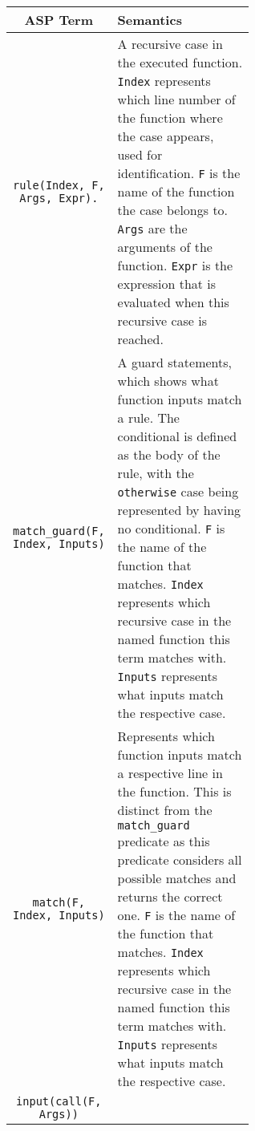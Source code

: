 \begin{center}
\begin{tabular}{| c | m{0.6\linewidth} |}
\hline
\textbf{ASP Term} & \textbf{Semantics} \\
\hline
\lstinline!rule(Index, F, Args, Expr).! 
&
\mbox{}\newline
A recursive case in the executed function. \newline
\lstinline!Index! represents which line number of the function where the case appears, used for identification.\newline
\lstinline!F! is the name of the function the case belongs to. \newline
\lstinline!Args! are the arguments of the function.\newline
\lstinline!Expr! is the expression that is evaluated when this recursive case is reached.\newline
\\
\hline
\lstinline!match_guard(F, Index, Inputs)! 
&
\mbox{}\newline
A guard statements, which shows what function inputs match a rule. The conditional is defined as the body of the rule, with the \lstinline!otherwise! case being represented by having no conditional. \newline
\lstinline!F! is the name of the function that matches. \newline
\lstinline!Index! represents which recursive case in the named function this term matches with. \newline
\lstinline!Inputs! represents what inputs match the respective case.\newline
\\
\hline
\lstinline!match(F, Index, Inputs)! 
&
\mbox{}\newline
Represents which function inputs match a respective line in the function. This is distinct from the \lstinline!match_guard! predicate as this predicate considers all possible matches and returns the correct one. \newline
\lstinline!F! is the name of the function that matches. \newline
\lstinline!Index! represents which recursive case in the named function this term matches with. \newline
\lstinline!Inputs! represents what inputs match the respective case.\newline
\\
\hline
\lstinline!input(call(F, Args))!
&
\mbox{}\newline

\end{tabular}
\end{center}
